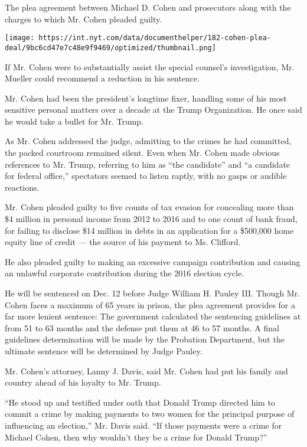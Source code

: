 The plea agreement between Michael D. Cohen and prosecutors along with
the charges to which Mr. Cohen pleaded guilty.

\texttt{[image: https://int.nyt.com/data/documenthelper/182-cohen-plea-deal/9bc6cd47e7c48e9f9469/optimized/thumbnail.png]}

If Mr. Cohen were to substantially assist the special counsel's
investigation, Mr. Mueller could recommend a reduction in his sentence.

Mr. Cohen had been the president's longtime fixer, handling some of his
most sensitive personal matters over a decade at the Trump Organization.
He once said he would take a bullet for Mr. Trump.

As Mr. Cohen addressed the judge, admitting to the crimes he had
committed, the packed courtroom remained silent. Even when Mr. Cohen
made obvious references to Mr. Trump, referring to him as ``the
candidate'' and ``a candidate for federal office,'' spectators seemed to
listen raptly, with no gasps or audible reactions.

Mr. Cohen pleaded guilty to five counts of tax evasion for concealing
more than \$4 million in personal income from 2012 to 2016 and to one
count of bank fraud, for failing to disclose \$14 million in debts in an
application for a \$500,000 home equity line of credit --- the source of
his payment to Ms. Clifford.

He also pleaded guilty to making an excessive campaign contribution and
causing an unlawful corporate contribution during the 2016 election
cycle.

He will be sentenced on Dec. 12 before Judge William H. Pauley III.
Though Mr. Cohen faces a maximum of 65 years in prison, the plea
agreement provides for a far more lenient sentence: The government
calculated the sentencing guidelines at from 51 to 63 months and the
defense put them at 46 to 57 months. A final guidelines determination
will be made by the Probation Department, but the ultimate sentence will
be determined by Judge Pauley.

Mr. Cohen's attorney, Lanny J. Davis, said Mr. Cohen had put his family
and country ahead of his loyalty to Mr. Trump.

``He stood up and testified under oath that Donald Trump directed him to
commit a crime by making payments to two women for the principal purpose
of influencing an election,'' Mr. Davis said. ``If those payments were a
crime for Michael Cohen, then why wouldn't they be a crime for Donald
Trump?''

